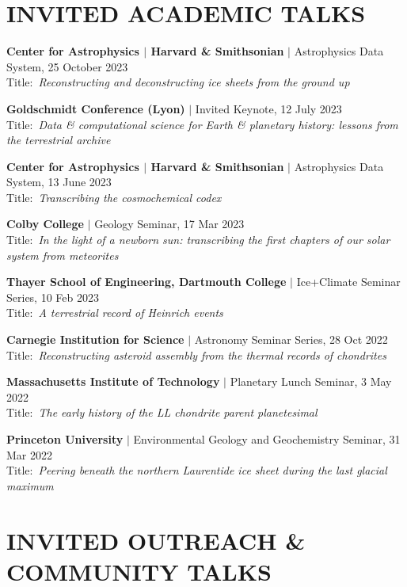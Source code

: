 \newcommand{\invitedtalk}[3]{\textbf{#1} $|$ {#2} \\ Title:~\textit{#3}}
\newcommand{\outreachtalk}[3]{\textbf{#1} $|$ {#2} \\ \quad \textit{#3}}
\section*{INVITED ACADEMIC TALKS}

\begin{etaremune} [itemsep=4pt, leftmargin=3ex,]
  \item \invitedtalk{Center for Astrophysics $|$ Harvard \& Smithsonian }{Astrophysics Data System, 25 October 2023}{Reconstructing and deconstructing ice sheets from the ground up}
  \item \invitedtalk{Goldschmidt Conference (Lyon)}{Invited Keynote, 12 July 2023}{Data \& computational science for Earth \& planetary history: lessons from the terrestrial archive}
  \item \invitedtalk{Center for Astrophysics $|$ Harvard \& Smithsonian }{Astrophysics Data System, 13 June 2023}{Transcribing the cosmochemical codex}
  \item \invitedtalk{Colby College}{Geology Seminar, 17 Mar 2023}{In the light of a newborn sun: transcribing the first chapters of our solar system from meteorites}
  \item \invitedtalk{Thayer School of Engineering, Dartmouth College}{Ice+Climate Seminar Series, 10 Feb 2023}{A terrestrial record of Heinrich events}
  \item \invitedtalk{Carnegie Institution for Science}{Astronomy Seminar Series, 28 Oct 2022}{Reconstructing asteroid assembly from the thermal records of chondrites}
  \item \invitedtalk{Massachusetts Institute of Technology}{Planetary Lunch Seminar, 3 May 2022}{The early history of the LL chondrite parent planetesimal}
  \item \invitedtalk{Princeton University}{Environmental Geology and Geochemistry Seminar, 31 Mar 2022}{Peering beneath the northern Laurentide ice sheet during the last glacial maximum}
  
\end{etaremune}

\section*{INVITED OUTREACH \& COMMUNITY TALKS}

